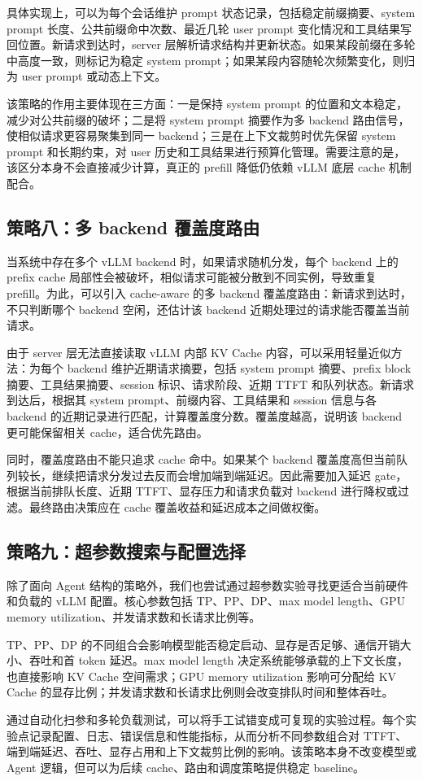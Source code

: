 具体实现上，可以为每个会话维护 prompt 状态记录，包括稳定前缀摘要、system prompt 长度、公共前缀命中次数、最近几轮 user prompt 变化情况和工具结果写回位置。新请求到达时，server 层解析请求结构并更新状态。如果某段前缀在多轮中高度一致，则标记为稳定 system prompt；如果某段内容随轮次频繁变化，则归为 user prompt 或动态上下文。

该策略的作用主要体现在三方面：一是保持 system prompt 的位置和文本稳定，减少对公共前缀的破坏；二是将 system prompt 摘要作为多 backend 路由信号，使相似请求更容易聚集到同一 backend；三是在上下文裁剪时优先保留 system prompt 和长期约束，对 user 历史和工具结果进行预算化管理。需要注意的是，该区分本身不会直接减少计算，真正的 prefill 降低仍依赖 vLLM 底层 cache 机制配合。

\subsection{策略八：多 backend 覆盖度路由}

当系统中存在多个 vLLM backend 时，如果请求随机分发，每个 backend 上的 prefix cache 局部性会被破坏，相似请求可能被分散到不同实例，导致重复 prefill。为此，可以引入 cache-aware 的多 backend 覆盖度路由：新请求到达时，不只判断哪个 backend 空闲，还估计该 backend 近期处理过的请求能否覆盖当前请求。

由于 server 层无法直接读取 vLLM 内部 KV Cache 内容，可以采用轻量近似方法：为每个 backend 维护近期请求摘要，包括 system prompt 摘要、prefix block 摘要、工具结果摘要、session 标识、请求阶段、近期 TTFT 和队列状态。新请求到达后，根据其 system prompt、前缀内容、工具结果和 session 信息与各 backend 的近期记录进行匹配，计算覆盖度分数。覆盖度越高，说明该 backend 更可能保留相关 cache，适合优先路由。

同时，覆盖度路由不能只追求 cache 命中。如果某个 backend 覆盖度高但当前队列较长，继续把请求分发过去反而会增加端到端延迟。因此需要加入延迟 gate，根据当前排队长度、近期 TTFT、显存压力和请求负载对 backend 进行降权或过滤。最终路由决策应在 cache 覆盖收益和延迟成本之间做权衡。

\subsection{策略九：超参数搜索与配置选择}

除了面向 Agent 结构的策略外，我们也尝试通过超参数实验寻找更适合当前硬件和负载的 vLLM 配置。核心参数包括 TP、PP、DP、max model length、GPU memory utilization、并发请求数和长请求比例等。

TP、PP、DP 的不同组合会影响模型能否稳定启动、显存是否足够、通信开销大小、吞吐和首 token 延迟。max model length 决定系统能够承载的上下文长度，也直接影响 KV Cache 空间需求；GPU memory utilization 影响可分配给 KV Cache 的显存比例；并发请求数和长请求比例则会改变排队时间和整体吞吐。

通过自动化扫参和多轮负载测试，可以将手工试错变成可复现的实验过程。每个实验点记录配置、日志、错误信息和性能指标，从而分析不同参数组合对 TTFT、端到端延迟、吞吐、显存占用和上下文裁剪比例的影响。该策略本身不改变模型或 Agent 逻辑，但可以为后续 cache、路由和调度策略提供稳定 baseline。
